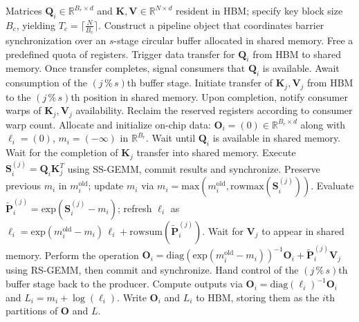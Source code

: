 \begin{algorithm}[H]
    \caption{\small\label{alg:flash3_wgmma_ws_only}\textsc{FlashAttention-3} forward pass \textbf{excluding} intra-consumer overlap -- CTA-oriented perspective}
    \begin{algorithmic}[1]
\REQUIRE Matrices $\mathbf{Q}_i \in \mathbb{R}^{B_r \times d}$ and $\mathbf{K}, \mathbf{V} \in \mathbb{R}^{N \times d}$ resident in HBM; specify key block size $B_c$, yielding $T_c = \lceil \frac{N}{B_c} \rceil$.
\STATE Construct a pipeline object that coordinates barrier synchronization over an $s$-stage circular buffer allocated in shared memory.
\STATE Free a predefined quota of registers.
\STATE Trigger data transfer for $\mathbf{Q}_i$ from HBM to shared memory.
\STATE Once transfer completes, signal consumers that $\mathbf{Q}_i$ is available.
    \STATE Await consumption of the $(j\,\%\,s)$th buffer stage.
    \STATE Initiate transfer of $\mathbf{K}_j, \mathbf{V}_j$ from HBM to the $(j\,\%\,s)$th position in shared memory.
    \STATE Upon completion, notify consumer warps of $\mathbf{K}_j, \mathbf{V}_j$ availability.
\ENDFOR
\ELSE \STATE Reclaim the reserved registers according to consumer warp count.
\STATE Allocate and initialize on-chip data: $\mathbf{O}_i = (0) \in \mathbb{R}^{B_r \times d}$ along with $\ell_i = (0)$, $m_i = (-\infty)$ in $\mathbb{R}^{B_r}$.
\STATE Wait until $\mathbf{Q}_i$ is available in shared memory.
\STATE Wait for the completion of $\mathbf{K}_j$ transfer into shared memory.
\STATE Execute $\mathbf{S}_i^{(j)} = \mathbf{Q}_i \mathbf{K}_j^T$ using SS-GEMM, commit results and synchronize. \label{alg:ws_only_gemm1}
\STATE Preserve previous $m_i$ in $m_i^{\mathrm{old}}$; update $m_i$ via $m_i = \mathrm{max}(m_i^{\mathrm{old}}, \mathrm{rowmax}(\mathbf{S}_i^{(j)}))$. \label{code-ws:softmax_start}
\STATE Evaluate $\widetilde{\mathbf{P}}_i^{(j)} = \mathrm{exp}(\mathbf{S}_i^{(j)} - m_i)$; refresh $\ell_i$ as $\ell_i = \mathrm{exp}(m_i^{\mathrm{old}} - m_i)\,\ell_i + \mathrm{rowsum}(\widetilde{\mathbf{P}}_i^{(j)})$. \label{code-ws:softmax_end}
\STATE Wait for $\mathbf{V}_j$ to appear in shared memory.
\STATE Perform the operation $\mathbf{O}_i = \mathrm{diag}(\mathrm{exp}(m_i^{\mathrm{old}} - m_i))^{-1}\mathbf{O}_i + \widetilde{\mathbf{P}}_i^{(j)} \mathbf{V}_j$ using RS-GEMM, then commit and synchronize. \label{alg:ws_only_gemm2}
\STATE Hand control of the $(j\,\%\,s)$th buffer stage back to the producer.
\ENDFOR
\STATE Compute outputs via $\mathbf{O}_i = \mathrm{diag}(\ell_i)^{-1} \mathbf{O}_i$ and $L_i = m_i + \log(\ell_i)$.
\STATE Write $\mathbf{O}_i$ and $L_i$ to HBM, storing them as the $i$th partitions of $\mathbf{O}$ and $L$.
\ENDIF
\end{algorithmic}
\end{algorithm}

